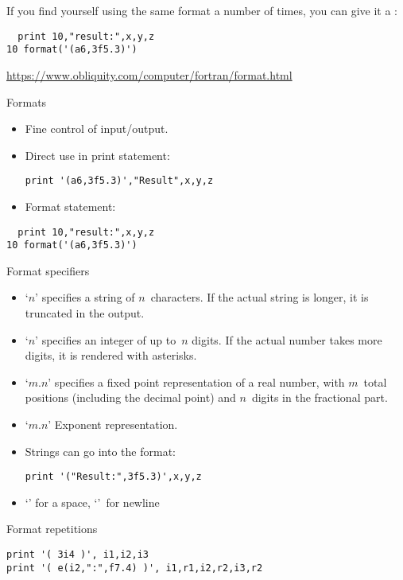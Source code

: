 If you find yourself using the same format a number of times, you can
give it a :
\begin{verbatim}
  print 10,"result:",x,y,z
10 format('(a6,3f5.3)')
\end{verbatim}

\url{https://www.obliquity.com/computer/fortran/format.html}

\begin{slide}{Formats}
  \label{sl:formats}
  \begin{itemize}
  \item
    Fine control of input/output.
  \item
    Direct use in print statement:  
\begin{verbatim}
print '(a6,3f5.3)',"Result",x,y,z
\end{verbatim}
\item Format statement:
  \end{itemize}
\begin{verbatim}
  print 10,"result:",x,y,z
10 format('(a6,3f5.3)')
\end{verbatim}
\end{slide}

\begin{slide}{Format specifiers}
  \label{sl:formatspec}
  \begin{itemize}
  \item `$n$' specifies a string of $n$~characters. If the actual
    string is longer, it is truncated in the output.
  \item `$n$' specifies an integer of up to~$n$ digits. If the actual
    number takes more digits, it is rendered with asterisks.
  \item `$m.n$' specifies a fixed point representation of a real
    number, with $m$~total positions (including the decimal point)
    and $n$~digits in the fractional part.
  \item `$m.n$' Exponent representation.
  \item Strings can go into the format:
\begin{verbatim}
print '("Result:",3f5.3)',x,y,z
\end{verbatim}
\item `' for a space, `\n{/}'~for newline
  \end{itemize}
\end{slide}

\begin{block}{Format repetitions}
  \label{sl:fformat-rep}
\begin{verbatim}
print '( 3i4 )', i1,i2,i3
print '( e(i2,":",f7.4) )', i1,r1,i2,r2,i3,r2
\end{verbatim}
\end{block}


